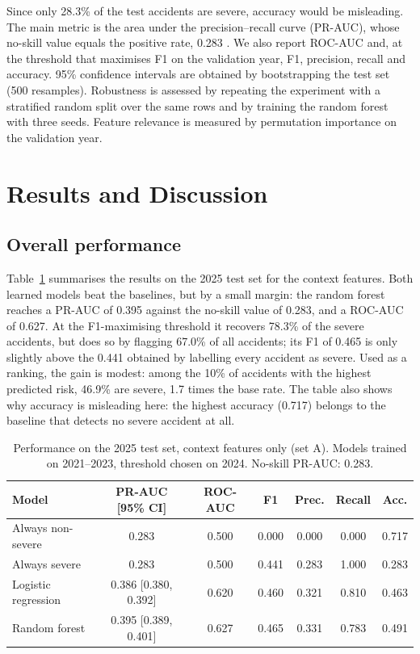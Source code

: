 \documentclass[12pt]{article}
\begin{document}
Since only 28.3\% of the test accidents are severe, accuracy would be
misleading. The main metric is the area under the precision--recall curve
(PR-AUC), whose no-skill value equals the positive rate, 0.283
\cite{saito2015}. We also report ROC-AUC and, at the threshold that maximises
F1 on the validation year, F1, precision, recall and accuracy. 95\% confidence
intervals are obtained by bootstrapping the test set (500 resamples).
Robustness is assessed by repeating the experiment with a stratified random
split over the same rows and by training the random forest with three seeds.
Feature relevance is measured by permutation importance on the validation year.

\section{Results and Discussion}

\subsection{Overall performance}

Table~\ref{tab:main} summarises the results on the 2025 test set for the
context features. Both learned models beat the baselines, but by a small
margin: the random forest reaches a PR-AUC of 0.395 against the no-skill value
of 0.283, and a ROC-AUC of 0.627. At the F1-maximising threshold it recovers
78.3\% of the severe accidents, but does so by flagging 67.0\% of all
accidents; its F1 of 0.465 is only slightly above the 0.441 obtained by
labelling every accident as severe. Used as a ranking, the gain is modest:
among the 10\% of accidents with the highest predicted risk, 46.9\% are severe,
1.7 times the base rate. The table also shows why accuracy is misleading here:
the highest accuracy (0.717) belongs to the baseline that detects no severe
accident at all.

\begin{table}[ht]
\centering
\caption{Performance on the 2025 test set, context features only (set A).
Models trained on 2021--2023, threshold chosen on 2024. No-skill PR-AUC: 0.283.}
\label{tab:main}
\small
\begin{tabular}{lcccccc}
\toprule
Model & PR-AUC [95\% CI] & ROC-AUC & F1 & Prec. & Recall & Acc. \\
\midrule
Always non-severe   & 0.283                & 0.500 & 0.000 & 0.000 & 0.000 & 0.717 \\
Always severe       & 0.283                & 0.500 & 0.441 & 0.283 & 1.000 & 0.283 \\
Logistic regression & 0.386 [0.380, 0.392] & 0.620 & 0.460 & 0.321 & 0.810 & 0.463 \\
Random forest       & 0.395 [0.389, 0.401] & 0.627 & 0.465 & 0.331 & 0.783 & 0.491 \\
\bottomrule
\end{tabular}
\end{table}
\end{document}
